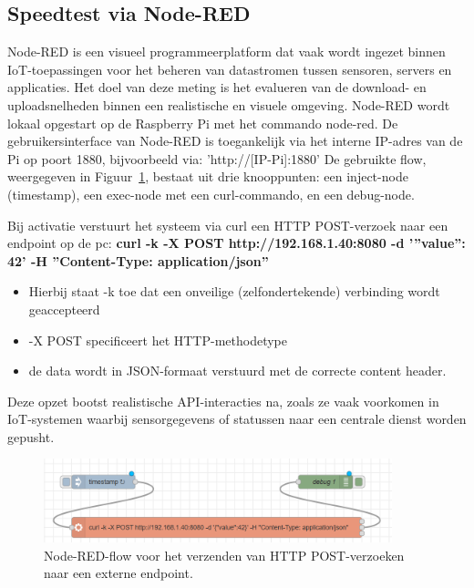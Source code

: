 \subsection{Speedtest via Node-RED}
Node-RED is een visueel programmeerplatform dat vaak wordt ingezet binnen IoT-toepassingen voor het beheren van datastromen tussen sensoren, servers en applicaties. Het doel van deze meting is het evalueren van de download- en uploadsnelheden binnen een realistische en visuele omgeving. 
Node-RED wordt lokaal opgestart op de Raspberry Pi met het commando node-red. De gebruikersinterface van Node-RED is toegankelijk via het interne IP-adres van de Pi op poort 1880, bijvoorbeeld via: ’http://[IP-Pi]:1880’
De gebruikte flow, weergegeven in Figuur~\ref{fig:nodered-flow}, bestaat uit drie knooppunten: een inject-node (timestamp), een exec-node met een curl-commando, en een debug-node. 

Bij activatie verstuurt het systeem via curl een HTTP POST-verzoek naar een endpoint op de pc: \textbf{curl -k -X POST http://192.168.1.40:8080 -d ’”value”: 42’ -H ”Content-Type: application/json”}


\begin{itemize}
    \item Hierbij staat -k toe dat een onveilige (zelfondertekende) verbinding wordt geaccepteerd
    \item -X POST specificeert het HTTP-methodetype
    \item de data wordt in JSON-formaat verstuurd met de correcte content header.
\end{itemize}

Deze opzet bootst realistische API-interacties na, zoals ze vaak voorkomen in IoT-systemen waarbij sensorgegevens of statussen naar een centrale dienst worden gepusht.


\begin{figure}[h]
    \centering
    \includegraphics[width=0.9\textwidth]{../graphics/node-red_flow.png}
    \caption{Node-RED-flow voor het verzenden van HTTP POST-verzoeken naar een externe endpoint.}
    \label{fig:nodered-flow}
\end{figure}

